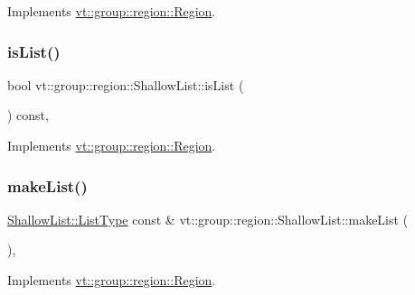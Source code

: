 Implements \hyperlink{structvt_1_1group_1_1region_1_1_region_a09d21333389937f11dd5d3e6ba566c54}{vt\+::group\+::region\+::\+Region}.

\mbox{\label{structvt_1_1group_1_1region_1_1_shallow_list_a5d83012cacf2a8ebeb3edb55603fceaa}} 
\subsubsection{\texorpdfstring{is\+List()}{isList()}}
{\footnotesize\ttfamily bool vt\+::group\+::region\+::\+Shallow\+List\+::is\+List (\begin{DoxyParamCaption}{ }\end{DoxyParamCaption}) const\hspace{0.3cm}{\ttfamily [override]}, {\ttfamily [virtual]}}



Implements \hyperlink{structvt_1_1group_1_1region_1_1_region_a5c05e6ebee5a6d7e77d9ebf33c9ff50c}{vt\+::group\+::region\+::\+Region}.

\mbox{\label{structvt_1_1group_1_1region_1_1_shallow_list_aecf1849757306e2d8a3c339a4bdb6453}} 
\subsubsection{\texorpdfstring{make\+List()}{makeList()}}
{\footnotesize\ttfamily \hyperlink{structvt_1_1group_1_1region_1_1_region_a4e35b2fc6dca06aca0b7bc0e19b35c5a}{Shallow\+List\+::\+List\+Type} const  \& vt\+::group\+::region\+::\+Shallow\+List\+::make\+List (\begin{DoxyParamCaption}{ }\end{DoxyParamCaption})\hspace{0.3cm}{\ttfamily [override]}, {\ttfamily [virtual]}}



Implements \hyperlink{structvt_1_1group_1_1region_1_1_region_ac85c027b3c402c712c888aefc198c6be}{vt\+::group\+::region\+::\+Region}.

